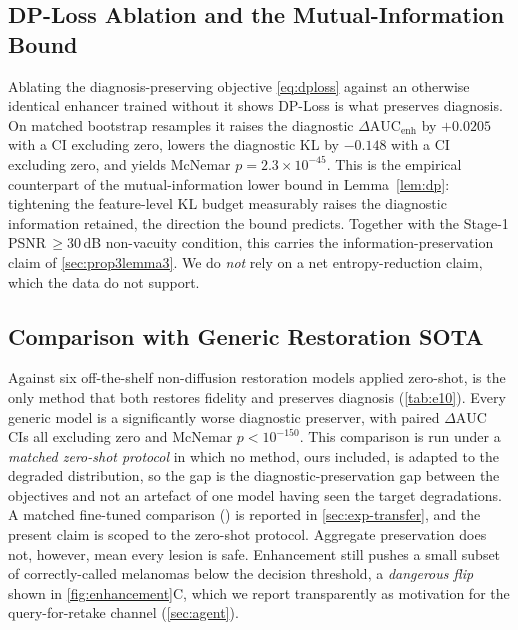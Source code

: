 \subsection{DP-Loss Ablation and the Mutual-Information Bound}\label{sec:exp-dploss}
Ablating the diagnosis-preserving objective \eqref{eq:dploss} against an otherwise
identical enhancer trained without it shows DP-Loss is what preserves diagnosis. On matched
bootstrap resamples it raises the diagnostic $\Delta\mathrm{AUC}_{\text{enh}}$ by $+0.0205$
with a CI excluding zero, lowers the diagnostic KL by $-0.148$ with a CI excluding zero, and
yields McNemar $p=2.3\times10^{-45}$. This is the empirical counterpart of the
mutual-information lower bound in Lemma~\ref{lem:dp}: tightening the feature-level KL budget
measurably raises the diagnostic information retained, the direction the bound predicts.
Together with the Stage-1 PSNR$\,\geq30$\,dB non-vacuity condition, this carries the
information-preservation claim of \cref{sec:prop3lemma3}. We do \emph{not} rely on a net
entropy-reduction claim, which the data do not support.

\subsection{Comparison with Generic Restoration SOTA}\label{sec:exp-sota}
Against six off-the-shelf non-diffusion restoration models applied zero-shot,
\visienhance{} is the only method that both restores fidelity and preserves diagnosis
(\cref{tab:e10}). Every generic model is a significantly worse diagnostic preserver, with
paired $\Delta\mathrm{AUC}$ CIs all excluding zero and McNemar $p<10^{-150}$. This
comparison is run under a \emph{matched zero-shot protocol} in which no method, ours
included, is adapted to the degraded distribution, so the gap is the
diagnostic-preservation gap between the objectives and not an artefact of one model having
seen the target degradations. A matched fine-tuned comparison () is reported in
\cref{sec:exp-transfer}, and the present claim is scoped to the zero-shot protocol.
Aggregate preservation does not, however, mean every lesion is safe. Enhancement still
pushes a small subset of correctly-called melanomas below the decision threshold, a
\emph{dangerous flip} shown in \cref{fig:enhancement}C, which we report transparently as
motivation for the query-for-retake channel (\cref{sec:agent}).


